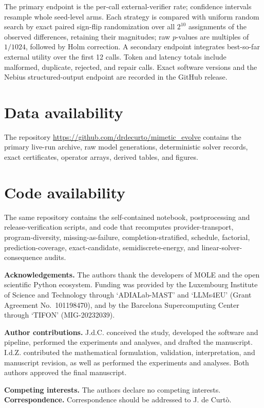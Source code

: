 \documentclass[lineno,pdflatex,sn-nature]{sn-jnl}
\theoremstyle{thmstyleone}
\begin{document}
The primary endpoint is the per-call external-verifier rate; confidence intervals resample whole seed-level arms. Each strategy is compared with uniform random search by exact paired sign-flip randomization over all $2^{10}$ assignments of the observed differences, retaining their magnitudes; raw $p$-values are multiples of $1/1024$, followed by Holm correction. A secondary endpoint integrates best-so-far external utility over the first 12 calls. Token and latency totals include malformed, duplicate, rejected, and repair calls. Exact software versions and the Nebius structured-output endpoint \cite{nebius2026api} are recorded in the GitHub release.

\section*{Data availability}
The repository \url{https://github.com/drdecurto/mimetic_evolve} contains the primary live-run archive, raw model generations, deterministic solver records, exact certificates, operator arrays, derived tables, and figures.

\section*{Code availability}
The same repository contains the self-contained notebook, postprocessing and release-verification scripts, and code that recomputes provider-transport, program-diversity, missing-as-failure, completion-stratified, schedule, factorial, prediction-coverage, exact-candidate, semidiscrete-energy, and linear-solver-consequence audits.

\backmatter


\par\smallskip\noindent\textbf{Acknowledgements.}
The authors thank the developers of MOLE and the open scientific Python ecosystem. Funding was provided by the Luxembourg Institute of Science and Technology through `ADIALab-MAST' and `LLMs4EU' (Grant Agreement No.~101198470), and by the Barcelona Supercomputing Center through `TIFON' (MIG-20232039).

\par\smallskip\noindent\textbf{Author contributions.}
J.d.C. conceived the study, developed the software and pipeline, performed the experiments and analyses, and drafted the manuscript. I.d.Z. contributed the mathematical formulation, validation, interpretation, and manuscript revision, as well as performed the experiments and analyses. Both authors approved the final manuscript.

\par\smallskip\noindent\textbf{Competing interests.}
The authors declare no competing interests. \textbf{Correspondence.} Correspondence should be addressed to J. de Curt\`o.
\end{document}
